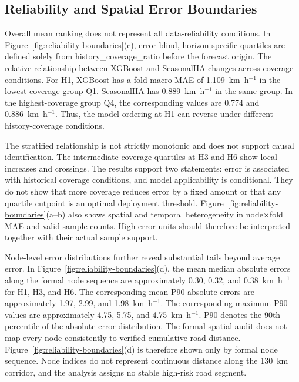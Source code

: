 \documentclass[pdflatex,sn-mathphys-num,iicol]{sn-jnl}
\begin{document}

\subsection{Reliability and Spatial Error Boundaries}
\label{subsec:reliability-spatial}

Overall mean ranking does not represent all data-reliability conditions. In Figure~\ref{fig:reliability-boundaries}(c), error-blind, horizon-specific quartiles are defined solely from history\_coverage\_ratio before the forecast origin. The relative relationship between XGBoost and SeasonalHA changes across coverage conditions. For H1, XGBoost has a fold-macro MAE of 1.109~km~h$^{-1}$ in the lowest-coverage group Q1. SeasonalHA has 0.889~km~h$^{-1}$ in the same group. In the highest-coverage group Q4, the corresponding values are 0.774 and 0.886~km~h$^{-1}$. Thus, the model ordering at H1 can reverse under different history-coverage conditions.

The stratified relationship is not strictly monotonic and does not support causal identification. The intermediate coverage quartiles at H3 and H6 show local increases and crossings. The results support two statements: error is associated with historical coverage conditions, and model applicability is conditional. They do not show that more coverage reduces error by a fixed amount or that any quartile cutpoint is an optimal deployment threshold. Figure~\ref{fig:reliability-boundaries}(a--b) also shows spatial and temporal heterogeneity in node$\times$fold MAE and valid sample counts. High-error units should therefore be interpreted together with their actual sample support.

Node-level error distributions further reveal substantial tails beyond average error. In Figure~\ref{fig:reliability-boundaries}(d), the mean median absolute errors along the formal node sequence are approximately 0.30, 0.32, and 0.38~km~h$^{-1}$ for H1, H3, and H6. The corresponding mean P90 absolute errors are approximately 1.97, 2.99, and 1.98~km~h$^{-1}$. The corresponding maximum P90 values are approximately 4.75, 5.75, and 4.75~km~h$^{-1}$. P90 denotes the 90th percentile of the absolute-error distribution. The formal spatial audit does not map every node consistently to verified cumulative road distance. Figure~\ref{fig:reliability-boundaries}(d) is therefore shown only by formal node sequence. Node indices do not represent continuous distance along the 130~km corridor, and the analysis assigns no stable high-risk road segment.
\end{document}
